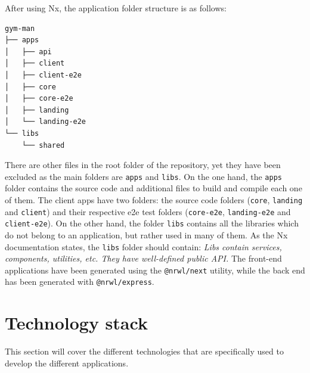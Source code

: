 \documentclass[a4paper, 12pt, oneside]{book}
\begin{document}
After using Nx, the application folder structure is as follows:
\begin{verbatim}
gym-man
├── apps
│   ├── api
│   ├── client
│   ├── client-e2e
│   ├── core
│   ├── core-e2e
│   ├── landing
│   └── landing-e2e
└── libs
    └── shared
\end{verbatim}
There are other files in the root folder of the repository, yet they have been excluded as the main folders are \texttt{apps} and \texttt{libs}. On the one hand, the \texttt{apps} folder contains the source code and additional files to build and compile each one of them. The client apps have two folders: the source code folders (\texttt{core}, \texttt{landing} and \texttt{client}) and their respective e2e test folders (\texttt{core-e2e}, \texttt{landing-e2e} and \texttt{client-e2e}). On the other hand, the folder \texttt{libs} contains all the libraries which do not belong to an application, but rather used in many of them. As the Nx documentation states, the \texttt{libs} folder should contain: \emph{Libs contain services, components, utilities, etc. They have well-defined public API.} The front-end applications have been generated using the \texttt{@nrwl/next} utility, while the back end has been generated with \texttt{@nrwl/express}.
\section{Technology stack}
This section will cover the different technologies that are specifically used to develop the different applications.
\end{document}
